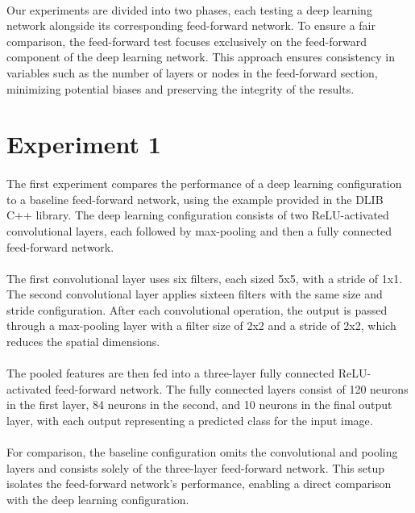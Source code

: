 \paragraph{}
Our experiments are divided into two phases, each testing a deep learning network alongside its corresponding feed-forward network. To ensure a fair comparison, the feed-forward test focuses exclusively on the feed-forward component of the deep learning network. This approach ensures consistency in variables such as the number of layers or nodes in the feed-forward section, minimizing potential biases and preserving the integrity of the results.

\section{Experiment 1}
\paragraph{}
The first experiment compares the performance of a deep learning configuration to a baseline feed-forward network, using the example provided in the DLIB C++ library. The deep learning configuration consists of two ReLU-activated convolutional layers, each followed by max-pooling and then a fully connected feed-forward network.

\paragraph{}
The first convolutional layer uses six filters, each sized 5x5, with a stride of 1x1. The second convolutional layer applies sixteen filters with the same size and stride configuration. After each convolutional operation, the output is passed through a max-pooling layer with a filter size of 2x2 and a stride of 2x2, which reduces the spatial dimensions.

\paragraph{}
The pooled features are then fed into a three-layer fully connected ReLU-activated feed-forward network. The fully connected layers consist of 120 neurons in the first layer, 84 neurons in the second, and 10 neurons in the final output layer, with each output representing a predicted class for the input image.

\paragraph{}
For comparison, the baseline configuration omits the convolutional and pooling layers and consists solely of the three-layer feed-forward network. This setup isolates the feed-forward network’s performance, enabling a direct comparison with the deep learning configuration.

